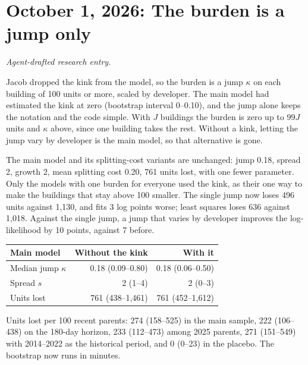 \clearpage
\section*{October 1, 2026: The burden is a jump only}
\textit{Agent-drafted research entry.}

Jacob dropped the kink from the model, so the burden is a jump $\kappa$ on each
building of 100 units or more, scaled by developer. The main model had
estimated the kink at zero (bootstrap interval 0--0.10), and the jump alone
keeps the notation and the code simple. With $J$ buildings the burden is zero
up to $99J$ units and $\kappa$ above, since one building takes the rest. Without
a kink, letting the jump vary by developer is the main model, so that
alternative is gone.

The main model and its splitting-cost variants are unchanged: jump 0.18,
spread 2, growth 2, mean splitting cost 0.20, 761 units lost, with one fewer
parameter. Only the models with one burden for everyone used the kink, as their
one way to make the buildings that stay above 100 smaller. The single jump now
loses 496 units against 1,130, and fits 3 log points worse; least squares loses
636 against 1,018. Against the single jump, a jump that varies by developer
improves the log-likelihood by 10 points, against 7 before.

\begin{center}
\small
\begin{tabular}{lrr}
\hline
Main model & Without the kink & With it \\
\hline
Median jump $\kappa$ & 0.18 (0.09--0.80) & 0.18 (0.06--0.50) \\
Spread $s$ & 2 (1--4) & 2 (0--3) \\
Units lost & 761 (438--1,461) & 761 (452--1,612) \\
\hline
\end{tabular}
\end{center}

Units lost per 100 recent parents: 274 (158--525) in the main sample, 222
(106--438) on the 180-day horizon, 233 (112--473) among 2025 parents, 271
(151--549) with 2014--2022 as the historical period, and 0 (0--23) in the
placebo. The bootstrap now runs in minutes.
